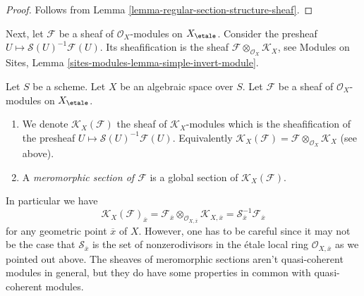 \begin{proof}
Follows from Lemma \ref{lemma-regular-section-structure-sheaf}.
\end{proof}

\noindent
Next, let $\mathcal{F}$ be a sheaf of $\mathcal{O}_X$-modules
on $X_\etale$.
Consider the presheaf $U \mapsto \mathcal{S}(U)^{-1}\mathcal{F}(U)$.
Its sheafification is the sheaf
$\mathcal{F} \otimes_{\mathcal{O}_X} \mathcal{K}_X$, see
Modules on Sites, Lemma \ref{sites-modules-lemma-simple-invert-module}.

\begin{definition}
\label{definition-meromorphic-section}
Let $S$ be a scheme. Let $X$ be an algebraic space over $S$.
Let $\mathcal{F}$ be a sheaf of $\mathcal{O}_X$-modules
on $X_\etale$.
\begin{enumerate}
\item We denote $\mathcal{K}_X(\mathcal{F})$ the sheaf of
$\mathcal{K}_X$-modules which is the sheafification of the presheaf
$U \mapsto \mathcal{S}(U)^{-1}\mathcal{F}(U)$. Equivalently
$\mathcal{K}_X(\mathcal{F}) =
\mathcal{F} \otimes_{\mathcal{O}_X} \mathcal{K}_X$ (see above).
\item A {\it meromorphic section of $\mathcal{F}$}
is a global section of $\mathcal{K}_X(\mathcal{F})$.
\end{enumerate}
\end{definition}

\noindent
In particular we have
$$
\mathcal{K}_X(\mathcal{F})_{\overline{x}}
=
\mathcal{F}_{\overline{x}}
\otimes_{\mathcal{O}_{X, \overline{x}}} \mathcal{K}_{X, \overline{x}}
=
\mathcal{S}_{\overline{x}}^{-1}\mathcal{F}_{\overline{x}}
$$
for any geometric point $\overline{x}$ of $X$. However, one has to be careful
since it may not be the case that $\mathcal{S}_{\overline{x}}$ is the set of
nonzerodivisors in the \'etale local ring $\mathcal{O}_{X, \overline{x}}$
as we pointed out above. The sheaves of meromorphic sections aren't
quasi-coherent modules in general, but they do have some properties in common
with quasi-coherent modules.

